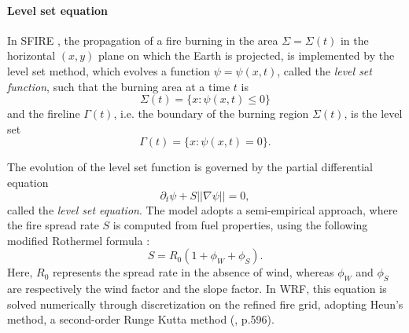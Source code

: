 \documentclass{juliacon}
\begin{document}
\paragraph{Level set equation}
In SFIRE \cite{Mandel}, the propagation of a fire burning in the area $\Sigma=\Sigma(t)$ in the horizontal $(x,y)$ plane on which the Earth is projected, is implemented by the level set method, which evolves a function $\psi = \psi(x,t)$, called the \textit{level set function}, such that the burning area at a time $t$ is $$ \Sigma(t) = \{ x: \psi(x,t)\leq0\}$$ and the fireline $\Gamma(t)$, i.e. the boundary of the burning region $\Sigma(t)$, is the level set 
\begin{equation}\label{fireline}
  \Gamma(t)= \{ x: \psi(x,t)=0\}.  
\end{equation}

The evolution of the level set function is governed by the partial differential equation 
\begin{equation}\label{level set}
   \partial_t \psi + S ||\nabla \psi || = 0,
\end{equation}
called the \textit{level set equation}.
The model adopts a semi-empirical approach, where the fire spread rate $S$ is computed from fuel properties, using the following modified Rothermel formula \cite{rothermel}: 
\begin{equation}\label{Rothermel}
    S= R_0 (1+ \phi_W + \phi_S).
\end{equation}
Here, $R_0$ represents the spread rate in the absence of wind, whereas $\phi_W$ and $\phi_S$ are respectively the wind factor and the slope factor. 
In WRF, this equation is solved numerically through discretization on the refined fire grid, adopting Heun's method, a second-order Runge Kutta method (\cite{Mandel}, p.596). 
\end{document}
